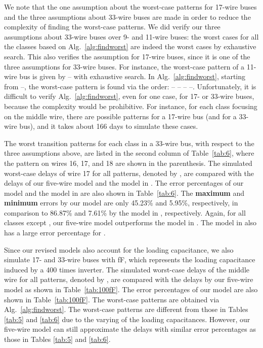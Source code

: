 \documentclass[10pt,journal]{IEEEtran}
\begin{document}
We note that the one assumption about the worst-case patterns for 17-wire buses and the three assumptions about 33-wire buses are made in order to reduce the complexity of finding the worst-case patterns. We did verify our three assumptions about 33-wire buses over 9- and 11-wire buses: the worst cases for all the classes based on Alg.~\ref{alg:findworst} are indeed the worst cases by exhaustive search.
This also verifies the assumption for 17-wire buses, since it is one of the three assumptions for 33-wire buses.
For instance, the worst-case  pattern of a 11-wire bus is given by -- with exhaustive search. In Alg.~\ref{alg:findworst}, starting from --, the worst-case pattern is found via the order: --  --  --  --.
Unfortunately, it is difficult to verify Alg.~\ref{alg:findworst}, even for one case, for 17- or 33-wire buses, because the complexity would be prohibitive. For instance, for each class focusing on the middle wire, there are  possible patterns for a 17-wire bus (and  for a 33-wire bus), and it takes about 166 days to simulate these cases.





The worst transition patterns for each class in a 33-wire bus, with respect to the three assumptions above, are listed in the second column of Table~\ref{tab:6}, where the pattern on wires 16, 17, and 18 are shown in the parenthesis.
The simulated worst-case delays of wire 17 for all  patterns, denoted by , are compared with the delays of our five-wire model and the model in \cite{Sot01}. The error percentages of our model and the model in \cite{Sot01} are also shown in Table~\ref{tab:6}. The \textbf{maximum} and \textbf{minimum} errors by our model are only 45.23\% and 5.95\%, respectively, in comparison to 86.87\% and 7.61\% by the model in \cite{Sot01}, respectively. Again, for all classes except , our five-wire model outperforms the model in \cite{Sot01}. The model in \cite{Sot01} also has a large error percentage for .

Since our revised models also account for the loading capacitance, we also simulate 17- and 33-wire buses with  fF, which represents the loading capacitance induced by a 400 times inverter. The simulated worst-case delays of the middle wire for all  patterns, denoted by , are compared with the delays  by our five-wire model as shown in Table~\ref{tab:100fF}. The error percentages of our model are also shown in Table~\ref{tab:100fF}. The worst-case patterns are obtained via Alg.~\ref{alg:findworst}. The worst-case patterns are different from those in Tables \ref{tab:5} and \ref{tab:6} due to the varying of the loading capacitances. However, our five-wire model can still approximate the delays with similar error percentages as those in Tables \ref{tab:5} and \ref{tab:6}.
\end{document}
